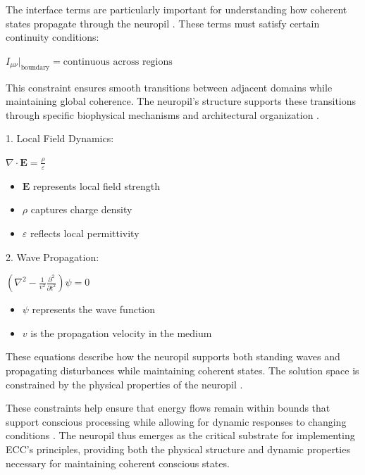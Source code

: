The interface terms are particularly important for understanding how coherent states propagate through the neuropil \cite{Doron2017}. These terms must satisfy certain continuity conditions:

$I_{\mu\nu}|_{\text{boundary}} = \text{continuous across regions}$

This constraint ensures smooth transitions between adjacent domains while maintaining global coherence. The neuropil's structure supports these transitions through specific biophysical mechanisms and architectural organization \cite{Korogod2015}.

1. Local Field Dynamics:

$\nabla \cdot \mathbf{E} = \frac{\rho}{\varepsilon}$

\begin{itemize}
\item $\mathbf{E}$ represents local field strength
\item $\rho$ captures charge density
\item $\varepsilon$ reflects local permittivity \cite{Savtchenko2014}
\end{itemize}

2. Wave Propagation:

$(\nabla^2 - \frac{1}{v^2}\frac{\partial^2}{\partial t^2})\psi = 0$

\begin{itemize}
\item $\psi$ represents the wave function
\item $v$ is the propagation velocity in the medium \cite{Arbib1998}
\end{itemize}

These equations describe how the neuropil supports both standing waves and propagating disturbances while maintaining coherent states. The solution space is constrained by the physical properties of the neuropil \cite{Peters1991}.

These constraints help ensure that energy flows remain within bounds that support conscious processing while allowing for dynamic responses to changing conditions \cite{Sorra2000}. The neuropil thus emerges as the critical substrate for implementing ECC's principles, providing both the physical structure and dynamic properties necessary for maintaining coherent conscious states.

